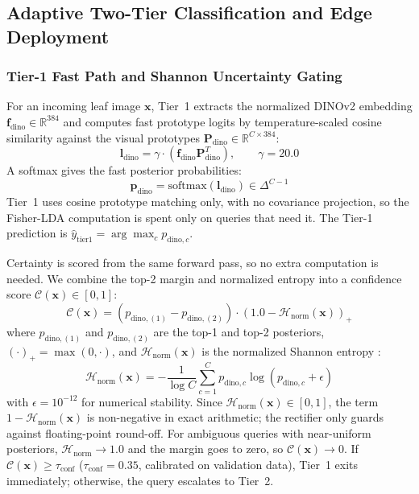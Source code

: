 \documentclass[preprint,12pt]{elsarticle}
\begin{document}
\subsection{Adaptive Two-Tier Classification and Edge Deployment}
\label{sec:edge_cascade}

\subsubsection{Tier-1 Fast Path and Shannon Uncertainty Gating}
For an incoming leaf image $\mathbf{x}$, Tier~1 extracts the normalized DINOv2 embedding $\mathbf{f}_{\text{dino}} \in \mathbb{R}^{384}$ and computes fast prototype logits by temperature-scaled cosine similarity against the visual prototypes $\mathbf{P}_{\text{dino}} \in \mathbb{R}^{C \times 384}$:
\begin{equation}
    \label{eq:tier1_logits}
    \mathbf{l}_{\text{dino}} = \gamma \cdot \left(\mathbf{f}_{\text{dino}} \mathbf{P}_{\text{dino}}^T\right), \qquad \gamma = 20.0
\end{equation}
A softmax gives the fast posterior probabilities:
\begin{equation}
    \label{eq:tier1_softmax}
    \mathbf{p}_{\text{dino}} = \text{softmax}(\mathbf{l}_{\text{dino}}) \in \Delta^{C-1}
\end{equation}
Tier~1 uses cosine prototype matching only, with no covariance projection, so the Fisher-LDA computation is spent only on queries that need it. The Tier-1 prediction is $\hat{y}_{\text{tier1}} = \arg\max_c p_{\text{dino}, c}$.

Certainty is scored from the same forward pass, so no extra computation is needed. We combine the top-2 margin and normalized entropy into a confidence score $\mathcal{C}(\mathbf{x}) \in [0, 1]$:
\begin{equation}
    \label{eq:shannon_gate}
    \mathcal{C}(\mathbf{x}) = \left(p_{\text{dino}, (1)} - p_{\text{dino}, (2)}\right) \cdot \left(1.0 - \mathcal{H}_{\text{norm}}(\mathbf{x})\right)_+
\end{equation}
where $p_{\text{dino}, (1)}$ and $p_{\text{dino}, (2)}$ are the top-1 and top-2 posteriors, $(\cdot)_+ = \max(0, \cdot)$, and $\mathcal{H}_{\text{norm}}(\mathbf{x})$ is the normalized Shannon entropy \cite{shannon1948mathematical}:
\begin{equation}
    \mathcal{H}_{\text{norm}}(\mathbf{x}) = -\frac{1}{\log C}\sum_{c=1}^C p_{\text{dino}, c}\log(p_{\text{dino}, c} + \epsilon)
\end{equation}
with $\epsilon = 10^{-12}$ for numerical stability. Since $\mathcal{H}_{\text{norm}}(\mathbf{x}) \in [0, 1]$, the term $1 - \mathcal{H}_{\text{norm}}(\mathbf{x})$ is non-negative in exact arithmetic; the rectifier only guards against floating-point round-off. For ambiguous queries with near-uniform posteriors, $\mathcal{H}_{\text{norm}} \to 1.0$ and the margin goes to zero, so $\mathcal{C}(\mathbf{x}) \to 0$. If $\mathcal{C}(\mathbf{x}) \ge \tau_{\text{conf}}$ ($\tau_{\text{conf}} = 0.35$, calibrated on validation data), Tier~1 exits immediately; otherwise, the query escalates to Tier~2.
\end{document}
